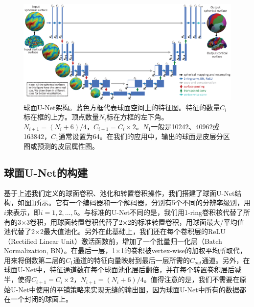 \begin{figure}[t]
	\centering
	\includegraphics[width=\linewidth]{figure/figure_unet.eps}
	\caption{球面U-Net架构。蓝色方框代表球面空间上的特征图。特征的数量$C_i$标在框的上方。顶点数量$N_i$标在方框的左下角。$N_{i+1}=(N_i+6)/4$，$C_{i+1}=C_i\times 2$。$N_1$一般是10242、40962或163842，$C_1$通常设置为64。在我们的应用中，输出的球面是皮层分区图或预测的皮层属性图。}
	\label{fig:fig_unet}
\end{figure}

\subsection{球面U-Net的构建}\label{sec:球面U-Net的构建}
基于上述我们定义的球面卷积、池化和转置卷积操作，我们搭建了球面U-Net结构，如图\ref{fig:fig_unet}所示。它有一个编码器和一个解码器，分别有5个不同的分辨率级别，用$i$来表示，即$i=1,2,\dots,5$。与标准的U-Net\cite{ronneberger2015u}不同的是，我们用1-ring卷积核代替了所有的3$\times$3卷积，用球面转置卷积代替了2$\times$2的标准转置卷积，用球面最大/平均值池代替了2$\times$2最大值池化。另外在此基础上，我们还在每个卷积层的ReLU（Rectified Linear Unit）激活函数前，增加了一个批量归一化层（Batch Normalization, BN）。在最后一层，1$\times$1的卷积被vertex-wise的加权平均所取代，用来将倒数第二层的$C_1$通道的特征向量映射到最后一层所需的$C_{out}$通道。另外，在球面U-Net中，特征通道数在每个球面池化层后翻倍，并在每个转置卷积层后减半，使得$C_{i+1}=C_i\times 2$，$N_{i+1}=(N_i+6)/4$。值得注意的是，我们不需要在原始U-Net\cite{ronneberger2015u}中使用的平铺策略来实现无缝的输出图，因为球面U-Net中所有的数据都在一个封闭的球面上。


